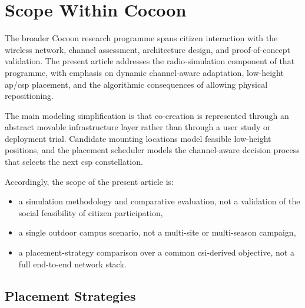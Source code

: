 \section{Scope Within Cocoon}

The broader Cocoon research programme spans citizen interaction with the wireless network, channel assessment, architecture design, and proof-of-concept validation. The present article addresses the radio-simulation component of that programme, with emphasis on dynamic channel-aware adaptation, low-height \gls{ap}/\gls{csp} placement, and the algorithmic consequences of allowing physical repositioning.

The main modeling simplification is that co-creation is represented through an abstract movable infrastructure layer rather than through a user study or deployment trial. Candidate mounting locations model feasible low-height positions, and the placement scheduler models the channel-aware decision process that selects the next \gls{csp} constellation.

Accordingly, the scope of the present article is:
\begin{itemize}
    \item a simulation methodology and comparative evaluation, not a validation of the social feasibility of citizen participation,
    \item a single outdoor campus scenario, not a multi-site or multi-season campaign,
    \item a placement-strategy comparison over a common \gls{csi}-derived objective, not a full end-to-end network stack.
\end{itemize}

\subsection{Placement Strategies}
\label{sec:placement_strategies}

